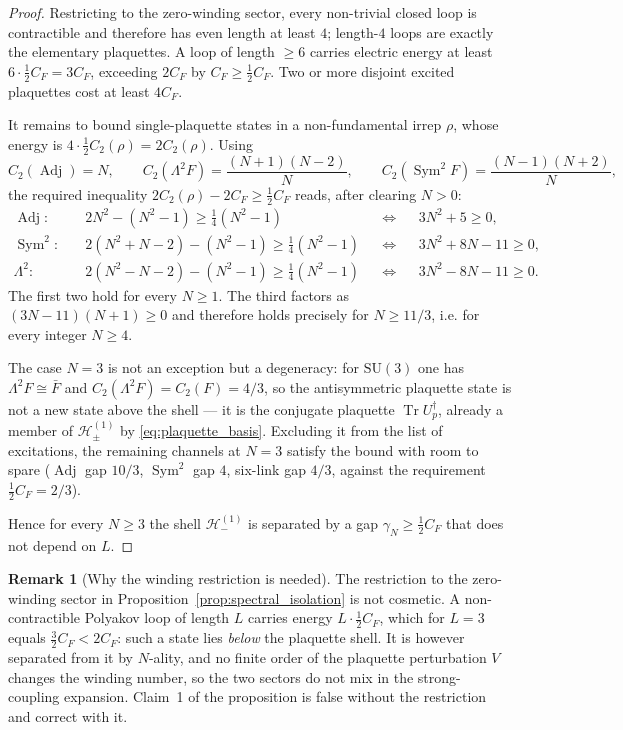 \documentclass[11pt,a4paper]{article}
\theoremstyle{definition}
\newtheorem{remark}[theorem]{Remark}
\DeclareMathOperator{\Tr}{Tr}
\DeclareMathOperator{\Adj}{Adj}
\DeclareMathOperator{\Sym}{Sym}
\newcommand{\CF}{C_F}
\newcommand{\dg}{^{\dagger}}
\newcommand{\SU}{\mathrm{SU}}
\begin{document}
\begin{proof}
Restricting to the zero-winding sector, every non-trivial closed loop is contractible and therefore has even length at least $4$; length-$4$ loops are exactly the elementary plaquettes. A loop of length $\ge 6$ carries electric energy at least $6\cdot\tfrac12\CF = 3\CF$, exceeding $2\CF$ by $\CF \ge \tfrac12\CF$. Two or more disjoint excited plaquettes cost at least $4\CF$.

It remains to bound single-plaquette states in a non-fundamental irrep $\rho$, whose energy is $4\cdot\tfrac12 C_2(\rho) = 2C_2(\rho)$. Using
\begin{equation*}
  C_2(\Adj) = N, \qquad
  C_2(\Lambda^2 F) = \frac{(N+1)(N-2)}{N}, \qquad
  C_2(\Sym^2 F) = \frac{(N-1)(N+2)}{N},
\end{equation*}
the required inequality $2C_2(\rho) - 2\CF \ge \tfrac12\CF$ reads, after clearing $N>0$:
\begin{align*}
  \Adj:&\quad 2N^2 - (N^2-1) \ge \tfrac{1}{4}(N^2-1) &&\Longleftrightarrow&& 3N^2 + 5 \ge 0, \\
  \Sym^2:&\quad 2(N^2+N-2) - (N^2-1) \ge \tfrac{1}{4}(N^2-1) &&\Longleftrightarrow&& 3N^2 + 8N - 11 \ge 0, \\
  \Lambda^2:&\quad 2(N^2-N-2) - (N^2-1) \ge \tfrac{1}{4}(N^2-1) &&\Longleftrightarrow&& 3N^2 - 8N - 11 \ge 0 .
\end{align*}
The first two hold for every $N\ge 1$. The third factors as $(3N-11)(N+1)\ge 0$ and therefore holds precisely for $N \ge 11/3$, i.e. for every integer $N \ge 4$.

The case $N=3$ is not an exception but a degeneracy: for $\SU(3)$ one has $\Lambda^2 F \cong \bar F$ and $C_2(\Lambda^2 F) = C_2(F) = 4/3$, so the antisymmetric plaquette state is not a new state above the shell --- it is the conjugate plaquette $\Tr U_p\dg$, already a member of $\mathcal{H}^{(1)}_\pm$ by \eqref{eq:plaquette_basis}. Excluding it from the list of excitations, the remaining channels at $N=3$ satisfy the bound with room to spare ($\Adj$ gap $10/3$, $\Sym^2$ gap $4$, six-link gap $4/3$, against the requirement $\tfrac12\CF = 2/3$).

Hence for every $N\ge3$ the shell $\mathcal{H}^{(1)}_-$ is separated by a gap $\gamma_N \ge \tfrac12\CF$ that does not depend on $L$.
\end{proof}

\begin{remark}[Why the winding restriction is needed]\label{rem:winding}
The restriction to the zero-winding sector in Proposition~\ref{prop:spectral_isolation} is not cosmetic. A non-contractible Polyakov loop of length $L$ carries energy $L\cdot\tfrac12\CF$, which for $L=3$ equals $\tfrac32\CF < 2\CF$: such a state lies \emph{below} the plaquette shell. It is however separated from it by $N$-ality, and no finite order of the plaquette perturbation $V$ changes the winding number, so the two sectors do not mix in the strong-coupling expansion. Claim~1 of the proposition is false without the restriction and correct with it.
\end{remark}
\end{document}
